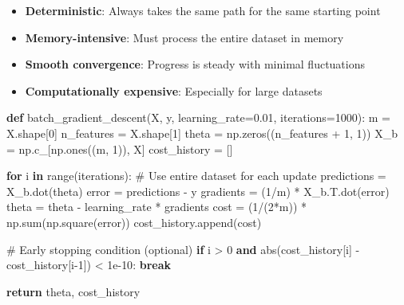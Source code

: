 \documentclass[
  letterpaper,
  DIV=11,
  numbers=noendperiod]{scrreprt}
\newenvironment{Shaded}{\begin{snugshade}}{\end{snugshade}}
\newcommand{\BuiltInTok}[1]{\textcolor[rgb]{0.00,0.23,0.31}{#1}}
\newcommand{\CommentTok}[1]{\textcolor[rgb]{0.37,0.37,0.37}{#1}}
\newcommand{\ControlFlowTok}[1]{\textcolor[rgb]{0.00,0.23,0.31}{\textbf{#1}}}
\newcommand{\DecValTok}[1]{\textcolor[rgb]{0.68,0.00,0.00}{#1}}
\newcommand{\FloatTok}[1]{\textcolor[rgb]{0.68,0.00,0.00}{#1}}
\newcommand{\KeywordTok}[1]{\textcolor[rgb]{0.00,0.23,0.31}{\textbf{#1}}}
\newcommand{\NormalTok}[1]{\textcolor[rgb]{0.00,0.23,0.31}{#1}}
\newcommand{\OperatorTok}[1]{\textcolor[rgb]{0.37,0.37,0.37}{#1}}
\providecommand{\tightlist}{%
  \setlength{\itemsep}{0pt}\setlength{\parskip}{0pt}}\usepackage{longtable,booktabs,array}
\begin{document}
\begin{itemize}
\tightlist
\item
  \textbf{Deterministic}: Always takes the same path for the same
  starting point
\item
  \textbf{Memory-intensive}: Must process the entire dataset in memory
\item
  \textbf{Smooth convergence}: Progress is steady with minimal
  fluctuations
\item
  \textbf{Computationally expensive}: Especially for large datasets
\end{itemize}

\begin{Shaded}
\begin{Highlighting}[]
\KeywordTok{def}\NormalTok{ batch\_gradient\_descent(X, y, learning\_rate}\OperatorTok{=}\FloatTok{0.01}\NormalTok{, iterations}\OperatorTok{=}\DecValTok{1000}\NormalTok{):}
\NormalTok{    m }\OperatorTok{=}\NormalTok{ X.shape[}\DecValTok{0}\NormalTok{]}
\NormalTok{    n\_features }\OperatorTok{=}\NormalTok{ X.shape[}\DecValTok{1}\NormalTok{]}
\NormalTok{    theta }\OperatorTok{=}\NormalTok{ np.zeros((n\_features }\OperatorTok{+} \DecValTok{1}\NormalTok{, }\DecValTok{1}\NormalTok{))}
\NormalTok{    X\_b }\OperatorTok{=}\NormalTok{ np.c\_[np.ones((m, }\DecValTok{1}\NormalTok{)), X]}
\NormalTok{    cost\_history }\OperatorTok{=}\NormalTok{ []}
    
    \ControlFlowTok{for}\NormalTok{ i }\KeywordTok{in} \BuiltInTok{range}\NormalTok{(iterations):}
        \CommentTok{\# Use entire dataset for each update}
\NormalTok{        predictions }\OperatorTok{=}\NormalTok{ X\_b.dot(theta)}
\NormalTok{        error }\OperatorTok{=}\NormalTok{ predictions }\OperatorTok{{-}}\NormalTok{ y}
\NormalTok{        gradients }\OperatorTok{=}\NormalTok{ (}\DecValTok{1}\OperatorTok{/}\NormalTok{m) }\OperatorTok{*}\NormalTok{ X\_b.T.dot(error)}
\NormalTok{        theta }\OperatorTok{=}\NormalTok{ theta }\OperatorTok{{-}}\NormalTok{ learning\_rate }\OperatorTok{*}\NormalTok{ gradients}
\NormalTok{        cost }\OperatorTok{=}\NormalTok{ (}\DecValTok{1}\OperatorTok{/}\NormalTok{(}\DecValTok{2}\OperatorTok{*}\NormalTok{m)) }\OperatorTok{*}\NormalTok{ np.}\BuiltInTok{sum}\NormalTok{(np.square(error))}
\NormalTok{        cost\_history.append(cost)}
        
        \CommentTok{\# Early stopping condition (optional)}
        \ControlFlowTok{if}\NormalTok{ i }\OperatorTok{\textgreater{}} \DecValTok{0} \KeywordTok{and} \BuiltInTok{abs}\NormalTok{(cost\_history[i] }\OperatorTok{{-}}\NormalTok{ cost\_history[i}\OperatorTok{{-}}\DecValTok{1}\NormalTok{]) }\OperatorTok{\textless{}} \FloatTok{1e{-}10}\NormalTok{:}
            \ControlFlowTok{break}
            
    \ControlFlowTok{return}\NormalTok{ theta, cost\_history}
\end{Highlighting}
\end{Shaded}
\end{document}
